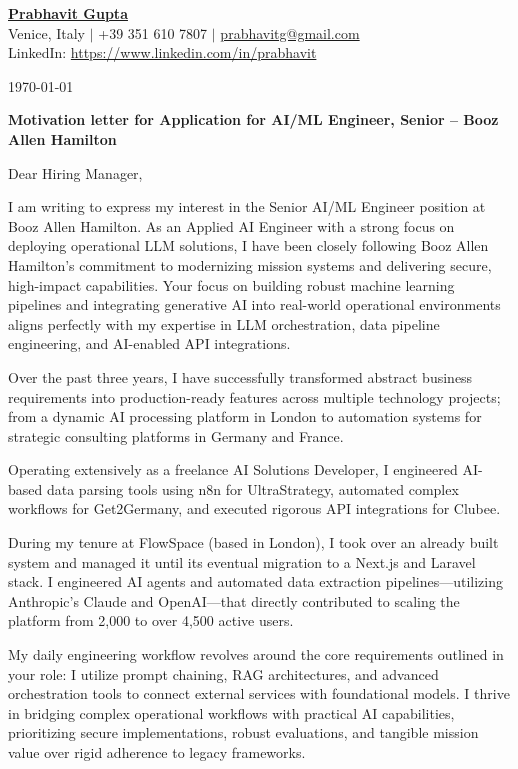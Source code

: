 \documentclass[a4paper,11pt]{article}
\begin{document}
\begin{center}
\textbf{\Large \underline{Prabhavit Gupta}}\\[1ex]
Venice, Italy $\vert$ +39 351 610 7807 $\vert$ \href{mailto:prabhavitg@gmail.com}{prabhavitg@gmail.com}\\[0.5ex]
LinkedIn: \href{https://www.linkedin.com/in/prabhavit}{https://www.linkedin.com/in/prabhavit}
\end{center}

\vspace{2em}
\today

\textbf{Motivation letter for Application for AI/ML Engineer, Senior -- Booz Allen Hamilton}

Dear Hiring Manager,

I am writing to express my interest in the Senior AI/ML Engineer position at Booz Allen Hamilton. As an Applied AI Engineer with a strong focus on deploying operational LLM solutions, I have been closely following Booz Allen Hamilton's commitment to modernizing mission systems and delivering secure, high-impact capabilities. Your focus on building robust machine learning pipelines and integrating generative AI into real-world operational environments aligns perfectly with my expertise in LLM orchestration, data pipeline engineering, and AI-enabled API integrations.

Over the past three years, I have successfully transformed abstract business requirements into production-ready features across multiple technology projects; from a dynamic AI processing platform in London to automation systems for strategic consulting platforms in Germany and France. 

Operating extensively as a freelance AI Solutions Developer, I engineered AI-based data parsing tools using n8n for UltraStrategy, automated complex workflows for Get2Germany, and executed rigorous API integrations for Clubee.

During my tenure at FlowSpace (based in London), I took over an already built system and managed it until its eventual migration to a Next.js and Laravel stack. I engineered AI agents and automated data extraction pipelines---utilizing Anthropic's Claude and OpenAI---that directly contributed to scaling the platform from 2,000 to over 4,500 active users. 

My daily engineering workflow revolves around the core requirements outlined in your role: I utilize prompt chaining, RAG architectures, and advanced orchestration tools to connect external services with foundational models. I thrive in bridging complex operational workflows with practical AI capabilities, prioritizing secure implementations, robust evaluations, and tangible mission value over rigid adherence to legacy frameworks.
\end{document}
